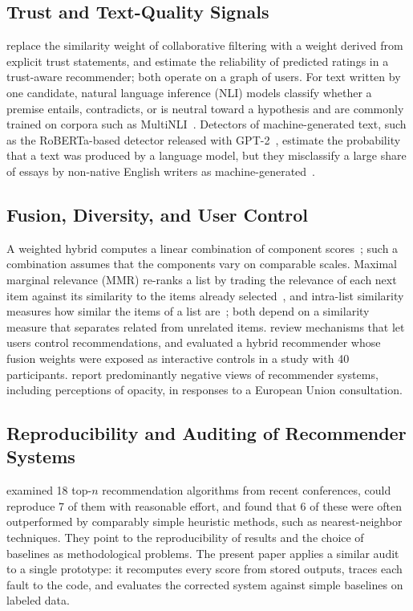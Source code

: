 \documentclass[CHICAGO]{USG}
\begin{document}
\subsection{Trust and Text-Quality Signals}
\citet{massa2004} replace the similarity weight of collaborative filtering with a weight derived from explicit trust statements, and \citet{moradi2015} estimate the reliability of predicted ratings in a trust-aware recommender; both operate on a graph of users. For text written by one candidate, natural language inference (NLI) models classify whether a premise entails, contradicts, or is neutral toward a hypothesis and are commonly trained on corpora such as MultiNLI~\citep{williams2018}. Detectors of machine-generated text, such as the RoBERTa-based detector released with GPT-2~\citep{solaiman2019}, estimate the probability that a text was produced by a language model, but they misclassify a large share of essays by non-native English writers as machine-generated~\citep{liang2023}.

\subsection{Fusion, Diversity, and User Control}
A weighted hybrid computes a linear combination of component scores~\citep{burke2002,alshamlan2023}; such a combination assumes that the components vary on comparable scales. Maximal marginal relevance (MMR) re-ranks a list by trading the relevance of each next item against its similarity to the items already selected~\citep{carbonell1998}, and intra-list similarity measures how similar the items of a list are~\citep{ziegler2005}; both depend on a similarity measure that separates related from unrelated items. \citet{jannach2017} review mechanisms that let users control recommendations, and \citet{parra2015} evaluated a hybrid recommender whose fusion weights were exposed as interactive controls in a study with 40 participants. \citet{ruohonen2024} report predominantly negative views of recommender systems, including perceptions of opacity, in responses to a European Union consultation.

\subsection{Reproducibility and Auditing of Recommender Systems}
\citet{ferraridacrema2019} examined 18 top-$n$ recommendation algorithms from recent conferences, could reproduce 7 of them with reasonable effort, and found that 6 of these were often outperformed by comparably simple heuristic methods, such as nearest-neighbor techniques. They point to the reproducibility of results and the choice of baselines as methodological problems. The present paper applies a similar audit to a single prototype: it recomputes every score from stored outputs, traces each fault to the code, and evaluates the corrected system against simple baselines on labeled data.
\end{document}
